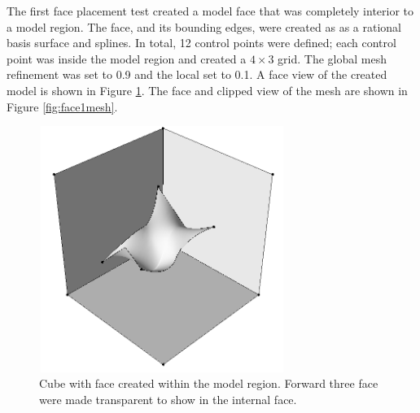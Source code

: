 \documentclass[a4paper, 12pt]{article}
\begin{document}
The first face placement test created a model face that was completely interior
to a model region.
The face, and its bounding edges,  were created as 
as a rational basis surface and splines. In total, 12 control points were 
defined; each control point was inside the model region and created a $4\times3$
grid. The global mesh refinement was set to 0.9 and the local set to 0.1. 
A face view of the created model is shown in Figure \ref{fig:face1model}.
The face and clipped view of the mesh are shown in Figure \ref{fig:face1mesh}.

\begin{figure}[H]
  \centering
  \includegraphics[width=8cm, height=8cm]{test10_smd_seeThrough}
  \caption{Cube with face created within the model region. Forward three face
        were made transparent to show in the internal face.}
  \label{fig:face1model}
\end{figure}
\end{document}
